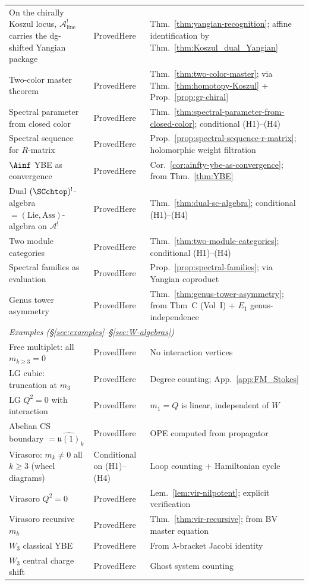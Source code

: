 \begin{center}
\begin{tabular}{p{}p{}p{}}
On the chirally Koszul locus, $\mathcal{A}^!_{\mathrm{line}}$ carries the dg-shifted Yangian package & ProvedHere & Thm.~\ref{thm:yangian-recognition}; affine identification by Thm.~\ref{thm:Koszul_dual_Yangian} \\
Two-color master theorem & ProvedHere & Thm.~\ref{thm:two-color-master}; via Thm.~\ref{thm:homotopy-Koszul} + Prop.~\ref{prop:gr-chiral} \\
Spectral parameter from closed color & ProvedHere & Thm.~\ref{thm:spectral-parameter-from-closed-color}; conditional (H1)--(H4) \\
Spectral sequence for $R$-matrix & ProvedHere & Prop.~\ref{prop:spectral-sequence-r-matrix}; holomorphic weight filtration \\
$\Ainf$ YBE as convergence & ProvedHere & Cor.~\ref{cor:ainfty-ybe-as-convergence}; from Thm.~\ref{thm:YBE} \\
Dual $(\SCchtop)^{!}$-algebra $= (\mathrm{Lie},\mathrm{Ass})$-algebra on $\mathcal{A}^!$ & ProvedHere & Thm.~\ref{thm:dual-sc-algebra}; conditional (H1)--(H4) \\
Two module categories & ProvedHere & Thm.~\ref{thm:two-module-categories}; conditional (H1)--(H4) \\
Spectral families as evaluation & ProvedHere & Prop.~\ref{prop:spectral-families}; via Yangian coproduct \\
Genus tower asymmetry & ProvedHere & Thm.~\ref{thm:genus-tower-asymmetry}; from Thm~C (Vol~I) + $E_1$ genus-independence \\
\hline
\multicolumn{3}{l}{\emph{Examples (\S\ref{sec:examples}--\S\ref{sec:W-algebras})}} \\
Free multiplet: all $m_{k\geq 3}=0$ & ProvedHere & No interaction vertices \\
LG cubic: truncation at $m_3$ & ProvedHere & Degree counting; App.~\ref{app:FM_Stokes} \\
LG $Q^2=0$ with interaction & ProvedHere & $m_1=Q$ is linear, independent of $W$ \\
Abelian CS boundary $= \widehat{\mathfrak{u}(1)}_k$ & ProvedHere & OPE computed from propagator \\
Virasoro: $m_k \ne 0$ all $k \ge 3$ (wheel diagrams) & Conditional on (H1)--(H4) & Loop counting + Hamiltonian cycle \\
Virasoro $Q^2=0$ & ProvedHere & Lem.~\ref{lem:vir-nilpotent}; explicit verification \\
Virasoro recursive $m_k$ & ProvedHere & Thm.~\ref{thm:vir-recursive}; from BV master equation \\
$W_3$ classical YBE & ProvedHere & From $\lambda$-bracket Jacobi identity \\
$W_3$ central charge shift & ProvedHere & Ghost system counting \\
\end{tabular}
\end{center}


